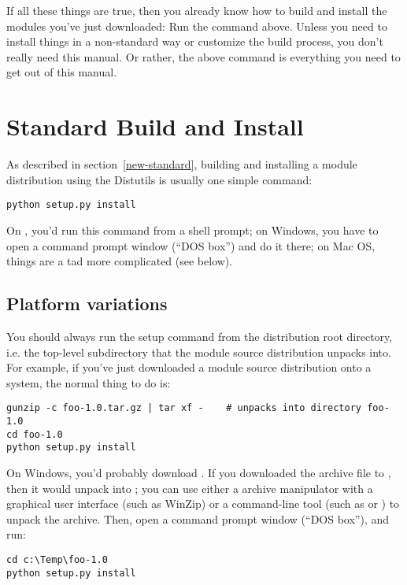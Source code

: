 \documentclass{howto}
\begin{document}
If all these things are true, then you already know how to build and
install the modules you've just downloaded:  Run the command above.
Unless you need to install things in a non-standard way or customize the
build process, you don't really need this manual.  Or rather, the above
command is everything you need to get out of this manual.


\section{Standard Build and Install}
\label{standard-install}

As described in section~\ref{new-standard}, building and installing
a module distribution using the Distutils is usually one simple command:

\begin{verbatim}
python setup.py install
\end{verbatim}

On \UNIX, you'd run this command from a shell prompt; on Windows, you
have to open a command prompt window (``DOS box'') and do it there; on
Mac OS, things are a tad more complicated (see below).


\subsection{Platform variations}
\label{platform-variations}

You should always run the setup command from the distribution root
directory, i.e. the top-level subdirectory that the module source
distribution unpacks into.  For example, if you've just downloaded a
module source distribution  onto a
\UNIX{} system, the normal thing to do is:

\begin{verbatim}
gunzip -c foo-1.0.tar.gz | tar xf -    # unpacks into directory foo-1.0
cd foo-1.0
python setup.py install
\end{verbatim}

On Windows, you'd probably download .  If you
downloaded the archive file to , then it
would unpack into ;
you can use either a archive manipulator with a graphical user interface
(such as WinZip) or a command-line tool (such as  or
) to unpack the archive.  Then, open a command prompt
window (``DOS box''), and run:

\begin{verbatim}
cd c:\Temp\foo-1.0
python setup.py install
\end{verbatim}
\end{document}
